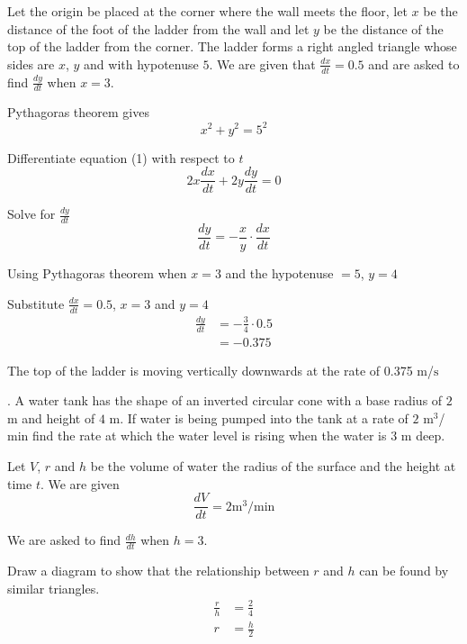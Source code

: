 \solution Let the origin be placed at the corner where the wall meets the floor, let $x$ be the distance of the foot of the ladder from the wall and let $y$ be the distance of the top of the ladder from the corner. The ladder forms a right
angled triangle whose sides are $x$, $y$ and with hypotenuse $5$. We are given that $\frac{d x}{d t} =0.5$ and are asked to find $\frac{d y}{d t}$ when $x =3$. 

Pythagoras theorem gives
\begin{equation}x^{2} +y^{2} =5^{2}\tag{1}
\end{equation}

Differentiate equation (1) with respect to $t$
\begin{equation*}2 x \frac{d x}{d t} +2 y \frac{d y}{d t} =0
\end{equation*}

Solve for $\frac{d y}{d t}$
\begin{equation*}\frac{d y}{d t} = -\frac{x}{y} \cdot \frac{d x}{d t}
\end{equation*}

Using Pythagoras theorem when $x =3$ and the hypotenuse $ =5$, $y =4$ 

Substitute $\frac{d x}{d t} =0.5$, $x =3$ and $y =4$
\begin{align*}\frac{d y}{d t} &  =  -\frac{3}{4} \cdot 0.5 \\
 &  =  -0.375\end{align*}

The top of the ladder is moving vertically downwards at the rate of 0.375 $\mbox{m}$/$\mbox{s}$ 

. A water tank has the shape of an inverted circular cone with a base radius of $2$ $\mbox{m}$ and height of $4$ $\mbox{m}$. If water is being pumped into
the tank at a rate of $2$ $\mathrm{m}^{3}$/$\mbox{min}$ find the rate at which the water level is rising when the water is $3$ $\mbox{m}$ deep. 

\solution Let $V$, $r$ and $h$ be the volume of water the radius of the surface and the height at time $t$. We are given
\begin{equation*}\frac{d V}{d t} =2\text{}\mathrm{m}^{3}/\mbox{min}
\end{equation*}

We are asked to find $\frac{d h}{d t}$ when $h =3$. 

Draw a diagram to show that the relationship between $r$ and $h$ can be found by similar triangles.
\begin{align}\frac{r}{h} &  = \frac{2}{4} \nonumber  \\
r &  = \frac{h}{2} \tag{1}\end{align}

